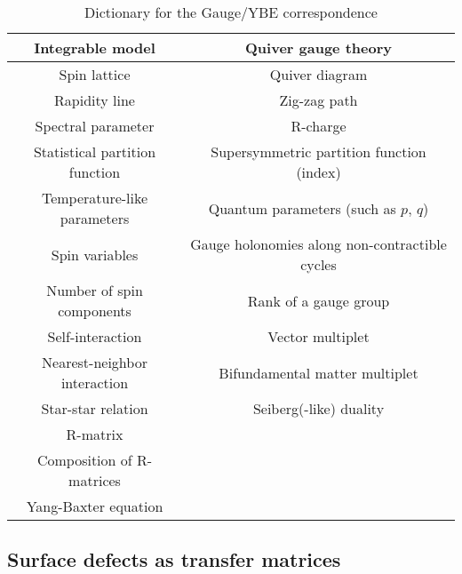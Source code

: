 \begin{table}
\caption{Dictionary for the Gauge/YBE correspondence}
\vspace{0.2cm}
  \centering
    \begin{tabular}{c|c}
Integrable model & Quiver gauge theory  \tabularnewline
\hline
\hline
Spin lattice            & Quiver diagram  \tabularnewline
Rapidity line          & Zig-zag path  \tabularnewline
Spectral parameter & R-charge  \tabularnewline
Statistical partition function    & Supersymmetric partition function (index)  \tabularnewline
Temperature-like parameters & Quantum parameters (such as $p,\,q$)  \tabularnewline
Spin variables       & Gauge holonomies along non-contractible cycles  \tabularnewline
Number of spin components  & Rank of a gauge group  \tabularnewline
Self-interaction    & Vector multiplet  \tabularnewline
Nearest-neighbor interaction & Bifundamental matter multiplet  \tabularnewline
Star-star relation  & Seiberg(-like) duality  \tabularnewline
R-matrix                  &                        \tabularnewline
Composition of R-matrices     &      \tabularnewline
Yang-Baxter equation &                \tabularnewline
    \end{tabular}
\label{tab:gauge_ybe}
\end{table}





\subsection{Surface defects as transfer matrices}


